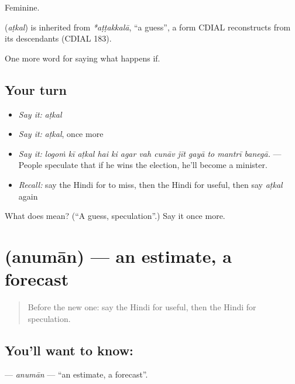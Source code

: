 Feminine.

\begin{cousinweb}
\textbf{} (\emph{aṭkal}) is inherited from \emph{*aṭṭakkalā}, \textquotedblleft{}a guess\textquotedblright{}, a form CDIAL reconstructs from its descendants (CDIAL 183).
\end{cousinweb}

\begin{grammarlens}[title={What you've built}]
One more word for saying what happens if.
\end{grammarlens}

\subsection*{Your turn}
\begin{itemize}
\raggedright
  \item \emph{Say it:} \emph{aṭkal}
  \item \emph{Say it:} \emph{aṭkal}, once more
  \item \emph{Say it:} \emph{logoṁ kī aṭkal hai ki agar vah cunāv jīt gayā to mantrī banegā.} — People speculate that if he wins the election, he'll become a minister.
  \item \emph{Recall:} say the Hindi for to miss, then the Hindi for useful, then say \emph{aṭkal} again
\end{itemize}

\begin{tcolorbox}[breakable,colback=teal!4,colframe=teal!35!black,title={Before you move on}]
What does  mean? (\textquotedblleft{}A guess, speculation\textquotedblright{}.) Say it once more.
\end{tcolorbox}
\section[\texorpdfstring{\hi{अनुमान} (anumān)}{अनुमान (anumān)}]{ (anumān) — an estimate, a forecast}

\label{lesson:HI-C374-anuman}



\begin{quote}
Before the new one: say the Hindi for useful, then the Hindi for speculation.
\end{quote}

\subsection*{You'll want to know: }
\textbf{} — \emph{anumān} — \textquotedblleft{}an estimate, a forecast\textquotedblright{}.


